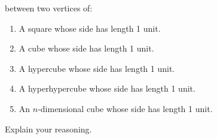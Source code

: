 \begin{enumerate}
  between two vertices of:
\begin{enumerate}
\item A square whose side has length 1 unit.
\item A cube whose side has length 1 unit.
\item A hypercube whose side has length 1 unit.
\item A hyperhypercube whose side has length 1 unit.
\item An $n$-dimensional cube whose side has length 1 unit.
\end{enumerate}
Explain your reasoning.
\end{enumerate}
